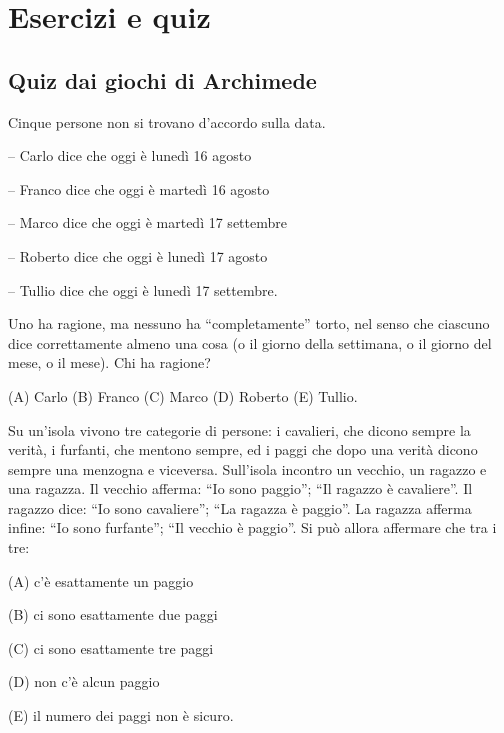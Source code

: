 \chapter{Esercizi e quiz}
\label{ch:quiz}

%

\section{Quiz dai giochi di Archimede}
\label{sec:quiz_giochi_archimede}

\begin{esercizio}
    \label{ex:archimede_1996_biennio_13}
    Cinque persone non si trovano d’accordo sulla data.

    – Carlo dice che oggi è lunedì 16 agosto

    – Franco dice che oggi è martedì 16 agosto

    – Marco dice che oggi è martedì 17 settembre

    – Roberto dice che oggi è lunedì 17 agosto

    – Tullio dice che oggi è lunedì 17 settembre.

    Uno ha ragione, ma nessuno ha “completamente” torto, nel senso che ciascuno
    dice correttamente almeno una cosa (o il giorno della settimana, o il giorno del
    mese, o il mese).
    Chi ha ragione?

    (A) Carlo \quad (B) Franco \quad (C) Marco \quad (D) Roberto \quad (E) Tullio.
\end{esercizio}

\begin{esercizio}
    \label{ex:archimede_1998_biennio_17}
    Su un’isola vivono tre categorie di persone: i cavalieri, che dicono sempre la verità, i furfanti,
    che mentono sempre, ed i paggi che dopo una verità dicono sempre una menzogna e viceversa.
    Sull’isola incontro un vecchio, un ragazzo e una ragazza.
    Il vecchio afferma: “Io sono paggio”;
    “Il ragazzo è cavaliere”.
    Il ragazzo dice: “Io sono cavaliere”;
    “La ragazza è paggio”.
    La ragazza afferma infine: “Io sono furfante”;
    “Il vecchio è paggio”.
    Si può allora affermare che tra i tre:

    (A) c’è esattamente un paggio

    (B) ci sono esattamente due paggi

    (C) ci sono esattamente tre paggi

    (D) non c’è alcun paggio

    (E) il numero dei paggi non è sicuro.
\end{esercizio}

